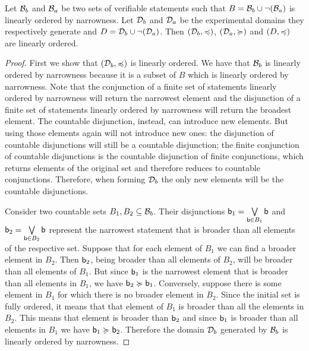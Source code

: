 \documentclass[11pt,letterpaper,fleqn]{memoir} %
\begin{document}
\begin{mathSection}
\begin{prop}\label{3_prop_generated_order}
	Let $\basis_b$ and $\basis_a$ be two sets of verifiable statements such that $B = \basis_b \cup \NOT(\basis_a)$ is linearly ordered by narrowness. Let $\edomain_b$ and $\edomain_a$ be the experimental domains they respectively generate and $D = \edomain_b \cup \NOT(\edomain_a)$. Then $(\edomain_b, \narrower)$, $(\edomain_a, \broader)$ and $(D, \narrower)$ are linearly ordered.
\end{prop}

\begin{proof}
	First we show that $(\edomain_b, \narrower)$ is linearly ordered. We have that $\basis_b$ is linearly ordered by narrowness because it is a subset of $B$ which is linearly ordered by narrowness. Note that the conjunction of a finite set of statements linearly ordered by narrowness will return the narrowest element and the disjunction of a finite set of statements linearly ordered by narrowness will return the broadest element. The countable disjunction, instead, can introduce new elements. But using those elements again will not introduce new ones: the disjunction of countable disjunctions will still be a countable disjunction; the finite conjunction of countable disjunctions is the countable disjunction of finite conjunctions, which returns elements of the original set and therefore reduces to countable conjunctions. Therefore, when forming $\edomain_b$ the only new elements will be the countable disjunctions.
	
	Consider two countable sets $B_1, B_2 \subseteq \basis_b$. Their disjunctions $\stmt[b]_1 = \bigOR\limits_{\stmt[b] \in B_1} \stmt[b]$ and $\stmt[b]_2 = \bigOR\limits_{\stmt[b] \in B_2} \stmt[b]$ represent the narrowest statement that is broader than all elements of the respective set. Suppose that for each element of $B_1$ we can find a broader element in $B_2$. Then $\stmt[b]_2$, being broader than all elements of $B_2$, will be broader than all elements of $B_1$. But since $\stmt[b]_1$ is the narrowest element that is broader than all elements in $B_1$, we have $\stmt[b]_2 \broader \stmt[b]_1$. Conversely, suppose there is some element in $B_1$ for which there is no broader element in $B_2$. Since the initial set is fully ordered, it means that that element of $B_1$ is broader than all the elements in $B_2$. This means that element is broader than $\stmt[b]_2$ and since $\stmt[b]_1$ is broader than all elements in $B_1$ we have $\stmt[b]_1 \broader \stmt[b]_2$. Therefore the domain $\edomain_b$ generated by $\basis_b$ is linearly ordered by narrowness.
	

\end{proof}
\end{mathSection}
\end{document}
